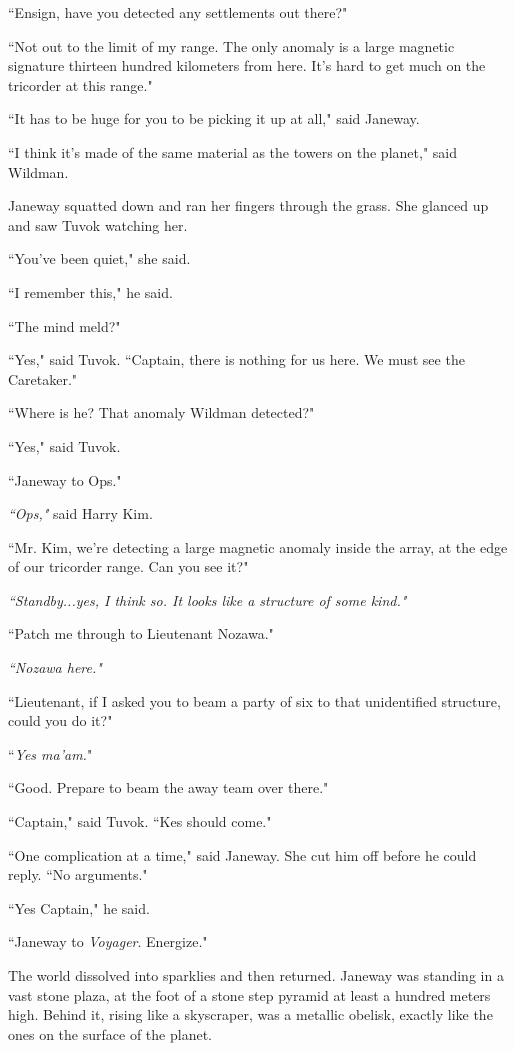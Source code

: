 \documentclass[twoside,letterpaper,12pt]{memoir}
\begin{document}
``Ensign, have you detected any settlements out there?" 

``Not out to the limit of my range. The only anomaly is a large magnetic signature thirteen hundred kilometers from here. It's hard to get much on the tricorder at this range." 

``It has to be huge for you to be picking it up at all," said Janeway. 

``I think it's made of the same material as the towers on the planet," said Wildman. 

Janeway squatted down and ran her fingers through the grass. She glanced up and saw Tuvok watching her. 

``You’ve been quiet," she said. 

``I remember this," he said. 

``The mind meld?" 

``Yes," said Tuvok. ``Captain, there is nothing for us here. We must see the Caretaker." 

``Where is he? That anomaly Wildman detected?" 

``Yes," said Tuvok. 

``Janeway to Ops."

\textit{``Ops," }said Harry Kim. 

``Mr. Kim, we're detecting a large magnetic anomaly inside the array, at the edge of our tricorder range. Can you see it?" 

\textit{``Standby...yes, I think so. It looks like a structure of some kind."} 

``Patch me through to Lieutenant Nozawa." 

\textit{``Nozawa here."} 

``Lieutenant, if I asked you to beam a party of six to that unidentified structure, could you do it?" 

``\textit{Yes ma'am.}" 

``Good. Prepare to beam the away team over there." 

``Captain," said Tuvok. ``Kes should come." 

``One complication at a time," said Janeway. She cut him off before he could reply. ``No arguments." 

``Yes Captain," he said. 

``Janeway to \textit{Voyager}. Energize." 

The world dissolved into sparklies and then returned. Janeway was standing in a vast stone plaza, at the foot of a stone step pyramid at least a hundred meters high. Behind it, rising like a skyscraper, was a metallic obelisk, exactly like the ones on the surface of the planet. 
\end{document}
